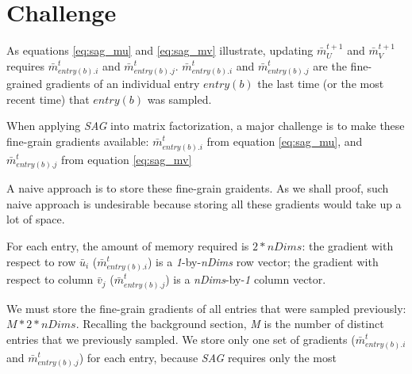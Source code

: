 \section{Challenge}
As equations \ref{eq:sag_mu} and \ref{eq:sag_mv} illustrate, updating $\bar{m}_{U}^{t+1}$ and $\bar{m}_{V}^{t+1}$ requires $\bar{m}_{entry(b).i}^{t}$ and $\bar{m}_{entry(b).j}^{t}$.  
$\bar{m}_{entry(b).i}^{t}$ and $\bar{m}_{entry(b).j}^{t}$ are the fine-grained gradients of an individual entry $entry(b)$ the last time (or the most recent time) that $entry(b)$ was sampled.  

When applying \emph{SAG} into matrix factorization, a major challenge is to make these fine-grain gradients available: 
$\bar{m}_{entry(b).i}^{t}$ from equation \ref{eq:sag_mu}, and 
$\bar{m}_{entry(b).j}^{t}$ from equation \ref{eq:sag_mv}  

A naive approach is to store these fine-grain graidents.  
As we shall proof, such naive approach is undesirable because storing all these gradients would take up a lot of space.  

\newtheorem{totalspace}{The total asymptotic space complexity of is }  
For each entry, the amount of memory required is $2*nDims$:  
the gradient with respect to row $\bar{u}_i$ ($\bar{m}_{entry(b).i}^{t}$) is a \emph{1}-by-\emph{nDims} row vector;  
the gradient with respect to column $\bar{v}_j$ ($\bar{m}_{entry(b).j}^{t}$) is a \emph{nDims}-by-\emph{1} column vector.  

We must store the fine-grain gradients of all entries that were sampled previously: $M*2*nDims$.  
Recalling the background section, \emph{M} is the number of distinct entries that we previously sampled.  
We store only one set of gradients ($\bar{m}_{entry(b).i}^{t}$ and $\bar{m}_{entry(b).j}^{t}$) for each entry, 
because \emph{SAG} requires only the most 
